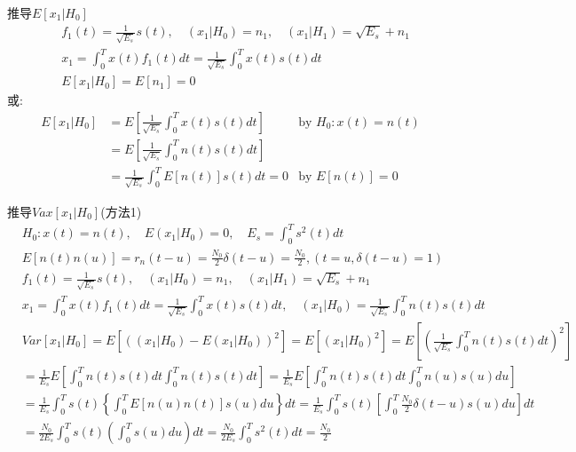 \begin{frame}[shrink]{推导$E[x_1|H_0]$}
\begin{align*}
&f_1(t)=\frac{1}{\sqrt{E_s}}s(t),\quad (x_1|H_0)=n_1,\quad (x_1|H_1)=\sqrt{E_s}+n_1\\ &x_1=\int_{0}^{T}x(t)f_1(t)dt=\frac{1}{\sqrt{E_s}}\int_{0}^{T}x(t)s(t)dt\\
&E[x_1|H_0]=E[n_1]=0
\end{align*}
或:
\begin{align*}
E[x_1|H_0]&=E\left[\frac{1}{\sqrt{E_s}}\int_{0}^{T}x(t)s(t)dt\right] &\text{by }H_0: x(t)=n(t)\\
&=E\left[\frac{1}{\sqrt{E_s}}\int_{0}^{T}n(t)s(t)dt\right]&\\
&=\frac{1}{\sqrt{E_s}}\int_{0}^{T}E[n(t)]s(t)dt=0 &\text{by }E[n(t)]=0
\end{align*}
\end{frame}

\begin{frame}[shrink]{推导$Vax[x_1|H_0]$(方法1)}
\begin{align*}
&H_0:x(t)=n(t),\quad E(x_1|H_0)=0,\quad E_s=\int_{0}^{T}s^2(t)dt\\
&E[n(t)n(u)]=r_n(t-u)=\frac{N_0}{2}\delta(t-u)=\frac{N_0}{2},(t=u,\delta(t-u)=1)\\
&f_1(t)=\frac{1}{\sqrt{E_s}}s(t),\quad (x_1|H_0)=n_1,\quad (x_1|H_1)=\sqrt{E_s}+n_1\\ &x_1=\int_{0}^{T}x(t)f_1(t)dt=\frac{1}{\sqrt{E_s}}\int_{0}^{T}x(t)s(t)dt,\quad (x_1|H_0)=\frac{1}{\sqrt{E_s}}\int_{0}^{T}n(t)s(t)dt
\end{align*}
\begin{align*}
&Var[x_1|H_0]=E[((x_1|H_0)-E(x_1|H_0))^2]=E[(x_1|H_0)^2]=E\left[\left(\frac{1}{\sqrt{E_s}}\int_{0}^{T}n(t)s(t)dt\right)^2\right]\\
&=\frac{1}{E_s}E\left[\int_{0}^{T}n(t)s(t)dt\int_{0}^{T}n(t)s(t)dt\right]=\frac{1}{E_s}E\left[\int_{0}^{T}n(t)s(t)dt\int_{0}^{T}n(u)s(u)du\right]\\
&=\frac{1}{E_s}\int_{0}^{T}s(t)\left\{\int_{0}^{T}E[n(u)n(t)]s(u)du\right\}dt=\frac{1}{E_s}\int_{0}^{T}s(t)\left[\int_{0}^{T}\frac{N_0}{2}\delta(t-u)s(u)du\right]dt\\
&=\frac{N_0}{2E_s}\int_{0}^{T}s(t)\left(\int_{0}^{T}s(u)du\right)dt=\frac{N_0}{2E_s}\int_{0}^{T}s^2(t)dt=\frac{N_0}{2}
\end{align*}
\end{frame}

